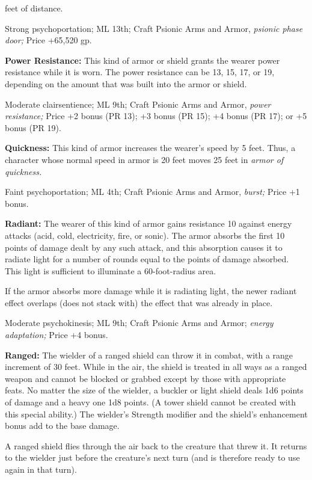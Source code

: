 \documentclass{article}
\begin{document}
feet of distance.

Strong psychoportation; ML 13th; Craft Psionic Arms and Armor, \textit{psionic 
phase door; }Price +65,520 gp.

\textbf{Power Resistance:} This kind of armor or shield grants the wearer power 
resistance while it is worn. The power resistance can be 13, 15, 17, or 19, depending 
on the amount that was built into the armor or shield.

Moderate clairsentience; ML 9th; Craft Psionic Arms and Armor, \textit{power resistance; 
}Price +2 bonus (PR 13); +3 bonus (PR 15); +4 bonus (PR 17); or +5 bonus (PR 19).

\textbf{Quickness: }This kind of armor increases the wearer's speed by 5 feet. 
Thus, a character whose normal speed in armor is 20 feet moves 25 feet in \textit{armor 
of quickness. }

Faint psychoportation; ML 4th; Craft Psionic Arms and Armor, \textit{burst; }Price 
+1 bonus.

\textbf{Radiant:} The wearer of this kind of armor gains resistance 10 against 
energy attacks (acid, cold, electricity, fire, or sonic). The armor absorbs the 
first 10 points of damage dealt by any such attack, and this absorption causes 
it to radiate light for a number of rounds equal to the points of damage absorbed. 
This light is sufficient to illuminate a 60-foot-radius area.

If the armor absorbs more damage while it is radiating light, the newer radiant 
effect overlaps (does not stack with) the effect that was already in place. 

Moderate psychokinesis; ML 9th; Craft Psionic Arms and Armor; \textit{energy adaptation; 
}Price +4 bonus.

\textbf{Ranged:} The wielder of a ranged shield can throw it in combat, with a 
range increment of 30 feet. While in the air, the shield is treated in all ways 
as a ranged weapon and cannot be blocked or grabbed except by those with appropriate 
feats. No matter the size of the wielder, a buckler or light shield deals 1d6 points 
of damage and a heavy one 1d8 points. (A tower shield cannot be created with this 
special ability.) The wielder's Strength modifier and the shield's enhancement 
bonus add to the base damage.

A ranged shield flies through the air back to the creature that threw it. It returns 
to the wielder just before the creature's next turn (and is therefore ready to 
use again in that turn).
\end{document}
